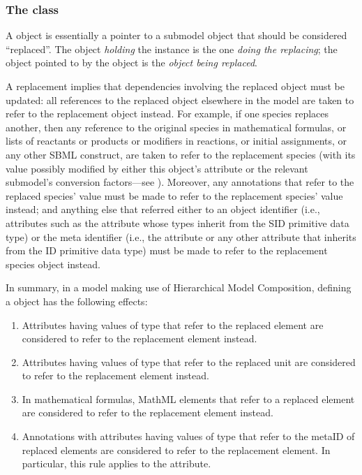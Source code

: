 \subsubsection{The  class}
\label{replacedelement-class}
\label{listofreplacedelements-class}

A \ReplacedElement object is essentially a pointer to a submodel object
that should be considered ``replaced''.  The object \emph{holding} the
\ReplacedElement instance is the one \emph{doing the replacing}; the
object pointed to by the \ReplacedElement object is the \emph{object
  being replaced}.

A replacement implies that dependencies involving the replaced object
must be updated: all references to the replaced object elsewhere in the
model are taken to refer to the replacement object instead.  For
example, if one species replaces another, then any reference to the
original species in mathematical formulas, or lists of reactants or
products or modifiers in reactions, or initial assignments, or any other
SBML construct, are taken to refer to the replacement species (with its
value possibly modified by either this object's 
attribute or the relevant submodel's conversion factors---see
). Moreover, any annotations that refer to the
replaced species'  value must be made to refer to the
replacement species'  value instead; and anything else
that referred either to an object identifier (i.e., attributes such as
the  attribute whose types inherit from the SID primitive data
type) or the meta identifier (i.e., the  attribute or any
other attribute that inherits from the ID primitive data type) must be
made to refer to the replacement species object instead.

In summary, in a \sbmlthreecore model making use of Hierarchical Model
Composition, defining a \ReplacedElement object has the following
effects:

\begin{enumerate}

\item Attributes having values of type  that refer to
  the replaced element are considered to refer to the replacement
  element instead.

\item Attributes having values of type  that refer
  to the replaced unit are considered to refer to the replacement
  element instead.

\item In mathematical formulas, MathML  elements that refer
  to a replaced element are considered to refer to the replacement
  element instead.

\item Annotations with attributes having values of type 
  that refer to the metaID of replaced elements are considered to refer
  to the replacement element. In particular, this rule applies to the
   attribute.

\end{enumerate}

